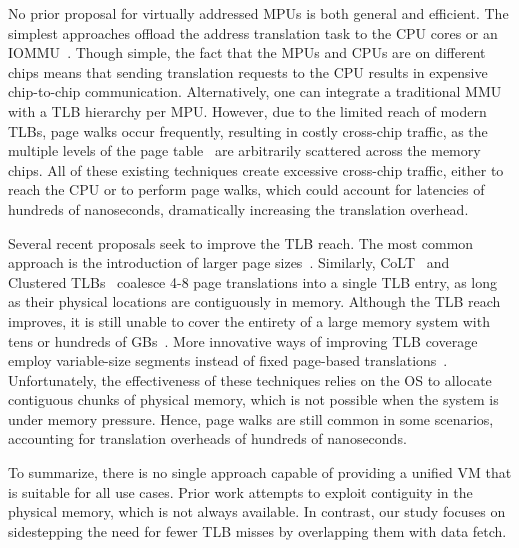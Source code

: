 
No prior proposal for virtually addressed MPUs is both general and efficient. The simplest approaches offload the address translation task to the CPU cores or an IOMMU~\cite{oskin:active, vesely:observation, gao:practical, xi:beyond}. Though simple, the fact that the MPUs and CPUs are on different chips means that sending translation requests to the CPU results in expensive chip-to-chip communication. Alternatively, one can integrate a traditional MMU with a TLB hierarchy per MPU. However, due to the limited reach of modern TLBs, page walks occur frequently, resulting in costly cross-chip traffic, as the multiple levels of the page table~\cite{gantz:hybrid} are arbitrarily scattered across the memory chips. All of these existing techniques create excessive cross-chip traffic, either to reach the CPU or to perform page walks, which could account for latencies of hundreds of nanoseconds, dramatically increasing the translation overhead.

Several recent proposals seek to improve the TLB reach. The most common approach is the introduction of larger page sizes~\cite{transparenthugepages, lighugetlbfs}. Similarly, CoLT~\cite{pham:colt} and Clustered TLBs~\cite{pham:increasing} coalesce 4-8 page translations into a single TLB entry, as long as their physical locations are contiguously in memory. Although the TLB reach improves, it is still unable to cover the entirety of a large memory system with tens or hundreds of GBs~\cite{gandhi:range}. More innovative ways of improving TLB coverage employ variable-size segments instead of fixed page-based translations~\cite{karakostas:redundant, park:hybrid, basu:efficient}. Unfortunately, the effectiveness of these techniques relies on the OS to allocate contiguous chunks of physical memory, which is not possible when the system is under memory pressure. Hence, page walks are still common in some scenarios, accounting for translation overheads of hundreds of nanoseconds. 

To summarize, there is no single approach capable of providing a unified VM that is suitable for all use cases. Prior work attempts to exploit contiguity in the physical memory, which is not always available. In contrast, our study focuses on sidestepping the need for fewer TLB misses by overlapping them with data fetch.






